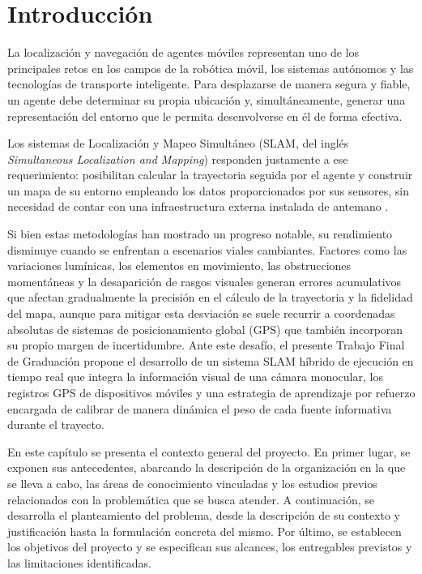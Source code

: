 
\chapter{Introducción}
\label{chp:intro}

La localización y navegación de agentes móviles representan uno de los principales retos en los campos de la robótica móvil, los sistemas autónomos y las tecnologías de transporte inteligente. Para desplazarse de manera segura y fiable, un agente debe determinar su propia ubicación y, simultáneamente, generar una representación del entorno que le permita desenvolverse en él de forma efectiva.

Los sistemas de Localización y Mapeo Simultáneo (SLAM, del inglés \textit{Simultaneous Localization and Mapping}) responden justamente a ese requerimiento: posibilitan calcular la trayectoria seguida por el agente y construir un mapa de su entorno empleando los datos proporcionados por sus sensores, sin necesidad de contar con una infraestructura externa instalada de antemano \cite{cadena2016slam}.

Si bien estas metodologías han mostrado un progreso notable, su rendimiento disminuye cuando se enfrentan a escenarios viales cambiantes. 
Factores como las variaciones lumínicas, los elementos en movimiento, las obstrucciones momentáneas y la desaparición de rasgos visuales generan errores acumulativos que afectan gradualmente la precisión en el cálculo de la trayectoria y la fidelidad del mapa, aunque para mitigar esta desviación se suele recurrir a coordenadas absolutas de sistemas de posicionamiento global (GPS) que también incorporan su propio margen de incertidumbre.
Ante este desafío, el presente Trabajo Final de Graduación propone el desarrollo de un sistema SLAM híbrido de ejecución en tiempo real que integra la información visual de una cámara monocular, los registros GPS de dispositivos móviles y una estrategia de aprendizaje por refuerzo encargada de calibrar de manera dinámica el peso de cada fuente informativa durante el trayecto.

En este capítulo se presenta el contexto general del proyecto. En primer lugar, se exponen sus antecedentes, abarcando la descripción de la organización en la que se lleva a cabo, las áreas de conocimiento vinculadas y los estudios previos relacionados con la problemática que se busca atender.
A continuación, se desarrolla el planteamiento del problema, desde la descripción de su contexto y justificación hasta la formulación concreta del mismo.
Por último, se establecen los objetivos del proyecto y se especifican sus alcances, los entregables previstos y las limitaciones identificadas.


